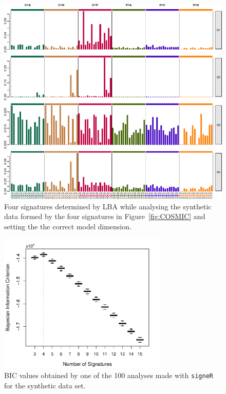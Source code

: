 \documentclass[11pt]{amsart}
\theoremstyle{definition}
\begin{document}
\begin{center}
\begin{figure}
  \includegraphics[width=16cm]{sfigs/Signature_Ale_plot_bcr1}
  \caption{Four signatures determined by LBA while
  analysing the synthetic data formed by the four signatures in
  Figure~\ref{fig:COSMIC} and setting the the correct model
  dimension.}\label{fig:LBA}
\end{figure}
\end{center}

\begin{center}
\begin{figure}
  \includegraphics[width=8cm]{sfigs/BICs_Simulated_21bc_with_Opportunity}
  \caption{BIC values obtained by one of the 100 analyses made with
    \texttt{signeR} for the synthetic data set.}\label{fig:BICS}
\end{figure}
\end{center}
\end{document}

